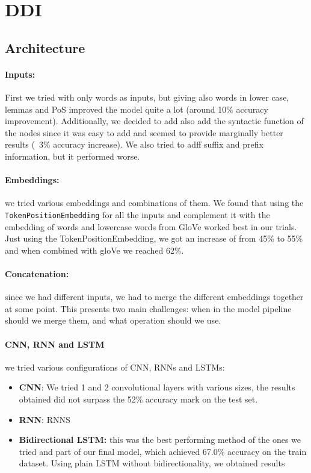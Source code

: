
\section{DDI}%
\label{sec:ddi}

\subsection{Architecture}%
\label{sub:ddi-arch}

\paragraph{Inputs:} First we tried with only words as inputs, but giving also words in
lower case, lemmas and PoS improved the model quite a lot (around 10\% accuracy improvement).
Additionally, we decided to add also add the syntactic function of the nodes since it was easy
to add and seemed to provide marginally better results (\approx \, 3\% accuracy increase).
We also tried to adff suffix and prefix information, but it performed worse.

\paragraph{Embeddings:} we tried various embeddings and combinations of them. We found that
using the \texttt{TokenPositionEmbedding} for all the inputs and complement it with the
embedding of words and lowercase words from GloVe worked best in our trials. Just using
the TokenPositionEmbedding, we got an increase of from 45\% to 55\% and when combined with gloVe
we reached 62\%.

\paragraph{Concatenation:} since we had different inputs, we had to merge the different embeddings
together at some point. This presents two main challenges: when in the model pipeline should we
merge them, and what operation should we use. %

\paragraph{CNN, RNN and LSTM} we tried various configurations of CNN, RNNs and LSTMs:

\begin{itemize}
\item \textbf{CNN}: We tried 1 and 2 convolutional layers with various sizes, the results
obtained did not surpass the 52\% accuracy mark on the test set.

\item \textbf{RNN}: RNNS

\item \textbf{Bidirectional LSTM:} this was the best performing method of the ones we tried and part
of our final model, which achieved 67.0\% accuracy on the train dataset. Using plain LSTM
without bidirectionality,
we obtained results
\end{itemize}

